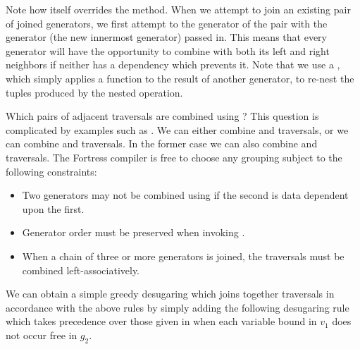 Note how  itself overrides the 
method.  When we attempt to join an existing pair of joined
generators, we first attempt to  the  generator
of the pair with the  generator (the new innermost
generator) passed in.  This means that every generator will have the
opportunity to combine with both its left and right neighbors if
neither has a dependency which prevents it.  Note that we use a
, which simply applies a function to the
result of another generator, to re-nest the tuples produced by the
nested  operation.

Which pairs of adjacent traversals are combined using ?
This question is complicated by examples such as
.  We can
either combine  and  traversals, or we can combine
 and  traversals.  In the former case we can also
combine  and  traversals.  The Fortress compiler is free
to choose any grouping subject to the following constraints:
\begin{itemize}
\item Two generators may not be combined using  if the second is data dependent upon the first.
\item Generator order must be preserved when invoking .
\item When a chain of three or more generators is joined, the
  traversals must be combined left-associatively.
\end{itemize}
We can obtain a simple greedy desugaring which joins together
traversals in accordance with the above rules by simply adding the
following desugaring rule which takes precedence over those given in
 when each variable bound in $v_1$ does not occur free in $g_2$.
\begin{center}
\EXP{\mathcal{T}\llbracket{}R,\boxplus\rrbracket[\,v_{1} \leftarrow g_{1}, v_{2} \leftarrow g_{2}, \VAR{gs}\,]\;\VAR{body}
\;\;=\;\;
\mathcal{T}\llbracket{}R,\boxplus\rrbracket[\,(v_{1},v_{2}) \leftarrow g_{1}.\VAR{join}(g_{2}), \VAR{gs}\,]\;\VAR{body}}
\end{center}


